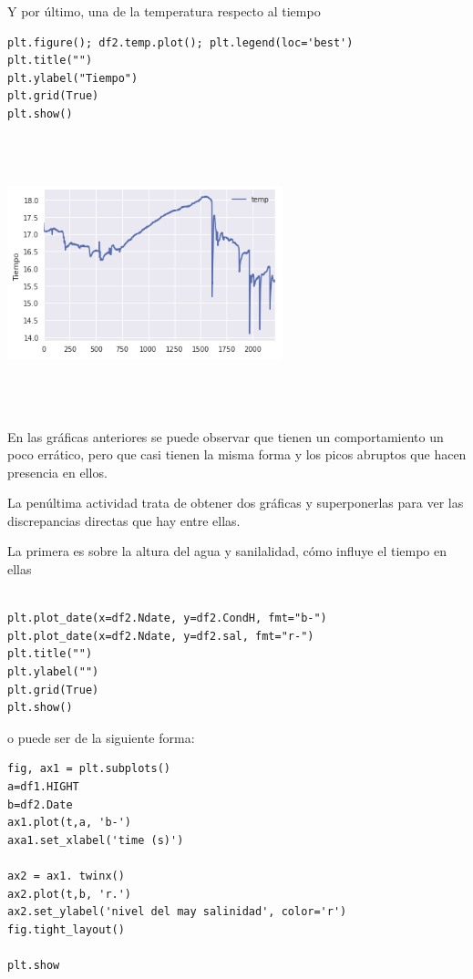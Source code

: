 \documentclass{article}
\begin{document}
Y por último, una de la temperatura respecto al tiempo

\begin{verbatim}
plt.figure(); df2.temp.plot(); plt.legend(loc='best')
plt.title("")
plt.ylabel("Tiempo")
plt.grid(True)
plt.show()
\end{verbatim}

\begin{center}

\includegraphics[width=8cm, height=8cm]{graf3.png}
\end{center}

En las gráficas anteriores se puede observar que tienen un comportamiento un poco errático, pero que casi tienen la misma forma y los picos abruptos que hacen presencia en ellos.

La penúltima actividad trata de obtener dos gráficas y superponerlas para ver las discrepancias directas que hay entre ellas.

La primera es sobre la altura del agua y sanilalidad, cómo influye el tiempo en ellas


\begin{verbatim}

plt.plot_date(x=df2.Ndate, y=df2.CondH, fmt="b-")
plt.plot_date(x=df2.Ndate, y=df2.sal, fmt="r-")
plt.title("")
plt.ylabel("")
plt.grid(True)
plt.show()

\end{verbatim}

o puede ser de la siguiente forma:

\begin{verbatim}
fig, ax1 = plt.subplots()
a=df1.HIGHT
b=df2.Date
ax1.plot(t,a, 'b-')
axa1.set_xlabel('time (s)')

ax2 = ax1. twinx()
ax2.plot(t,b, 'r.')
ax2.set_ylabel('nivel del may salinidad', color='r')
fig.tight_layout()

plt.show
\end{verbatim}
\end{document}
